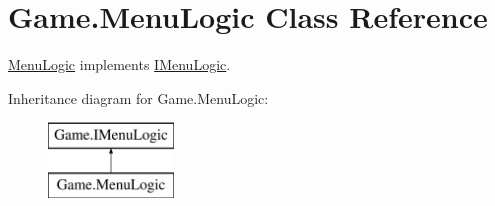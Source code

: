 \hypertarget{class_game_1_1_menu_logic}{}\section{Game.\+Menu\+Logic Class Reference}
\label{class_game_1_1_menu_logic}


\mbox{\hyperlink{class_game_1_1_menu_logic}{Menu\+Logic}} implements \mbox{\hyperlink{interface_game_1_1_i_menu_logic}{I\+Menu\+Logic}}.  


Inheritance diagram for Game.\+Menu\+Logic\+:\begin{figure}[H]
\begin{center}
\leavevmode
\includegraphics[height=2.000000cm]{class_game_1_1_menu_logic}
\end{center}
\end{figure}
